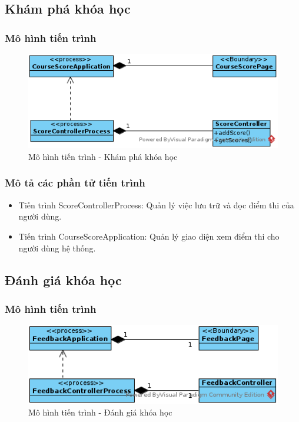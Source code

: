 \documentclass[./../main.tex]{subfiles}
\begin{document}
\subsection{Khám phá khóa học}

\subsubsection{Mô hình tiến trình}

\begin{figure}[H]
	\centering
	\includegraphics[width=\linewidth]{./images/pv_check_course_progress.png}
\caption{Mô hình tiến trình - Khám phá khóa học}

\end{figure}

\subsubsection{Mô tả các phần tử tiến trình}

\begin{itemize}
	\item Tiến trình ScoreControllerProcess: Quản lý việc lưu trữ và đọc điểm thi của người dùng.
	\item Tiến trình CourseScoreApplication: Quản lý giao diện xem điểm thi cho người dùng hệ thống.
\end{itemize}

\subsection{Đánh giá khóa học}

\subsubsection{Mô hình tiến trình}

\begin{figure}[H]
	\centering
	\includegraphics[width=\linewidth]{./images/pv_feedback_course.png}
\caption{Mô hình tiến trình - Đánh giá khóa học}

\end{figure}
\end{document}
